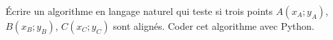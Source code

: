  
Écrire un algorithme en langage naturel qui teste si trois points $A(x_A;y_A)$, $B(x_B;y_B)$, $C(x_C;y_C)$ sont alignés. Coder cet algorithme avec Python.
